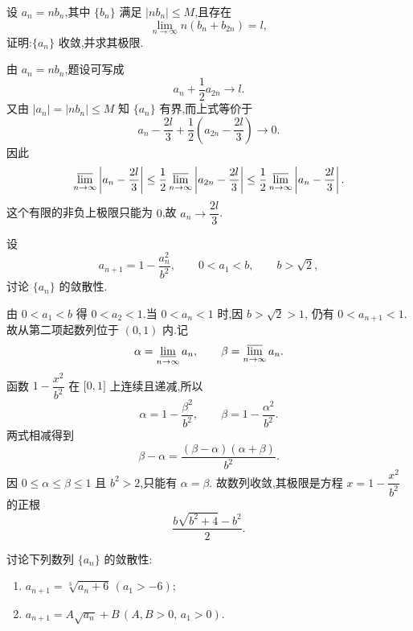 \begin{example}
  设 $a_n=nb_n$,其中 $\{b_n\}$ 满足 $|nb_n|\leq M$,且存在
  \[
    \displaystyle\lim\limits_{n\to\infty}n(b_n+b_{2n})=l,
  \]
  证明:$\{a_n\}$ 收敛,并求其极限.
\end{example}
\exampleblank

\begin{solution}
  由 $a_n=nb_n$,题设可写成
  \[
    a_n+\dfrac{1}{2}a_{2n}\longrightarrow l.
  \]
  又由 $|a_n|=|nb_n|\leq M$ 知 $\{a_n\}$ 有界,而上式等价于
  \[
    a_n-\dfrac{2l}{3}
    +\dfrac{1}{2}\left(a_{2n}-\dfrac{2l}{3}\right)\longrightarrow0.
  \]
  因此
  \[
    \varlimsup\limits_{n\to\infty}
    \left|a_n-\dfrac{2l}{3}\right|
    \leq\dfrac{1}{2}
    \varlimsup\limits_{n\to\infty}
    \left|a_{2n}-\dfrac{2l}{3}\right|
    \leq\dfrac{1}{2}
    \varlimsup\limits_{n\to\infty}
    \left|a_n-\dfrac{2l}{3}\right|.
  \]
  这个有限的非负上极限只能为 $0$,故 $a_n\to\dfrac{2l}{3}$.
\end{solution}

\begin{example}
  设
  \[
    a_{n+1}=1-\dfrac{a_n^2}{b^2},
    \qquad 0<a_1<b,
    \qquad b>\sqrt2,
  \]
  讨论 $\{a_n\}$ 的敛散性.
\end{example}
\exampleblank

\begin{solution}
  由 $0<a_1<b$ 得 $0<a_2<1$.当 $0<a_n<1$ 时,因 $b>\sqrt2>1$,
  仍有 $0<a_{n+1}<1$.故从第二项起数列位于 $(0,1)$ 内.记
  \[
    \alpha=\varliminf\limits_{n\to\infty}a_n,
    \qquad
    \beta=\varlimsup\limits_{n\to\infty}a_n.
  \]
  函数 $1-\dfrac{x^2}{b^2}$ 在 $\lbrack0,1\rbrack$ 上连续且递减,所以
  \[
    \alpha=1-\dfrac{\beta^2}{b^2},
    \qquad
    \beta=1-\dfrac{\alpha^2}{b^2}.
  \]
  两式相减得到
  \[
    \beta-\alpha
    =\dfrac{(\beta-\alpha)(\alpha+\beta)}{b^2}.
  \]
  因 $0\leq\alpha\leq\beta\leq1$ 且 $b^2>2$,只能有 $\alpha=\beta$.
  故数列收敛,其极限是方程 $x=1-\dfrac{x^2}{b^2}$ 的正根
  \[
    \dfrac{b\sqrt{b^2+4}-b^2}{2}.
  \]
\end{solution}

\begin{example}
  讨论下列数列 $\{a_n\}$ 的敛散性:
  \begin{enumerate}
    \item $\displaystyle a_{n+1}=\sqrt[3]{a_n+6}\,(a_1>-6)$;
    \item $\displaystyle a_{n+1}=A\sqrt{a_n}+B\,(A,B>0,\,a_1>0)$.
  \end{enumerate}
\end{example}
\exampleblank

